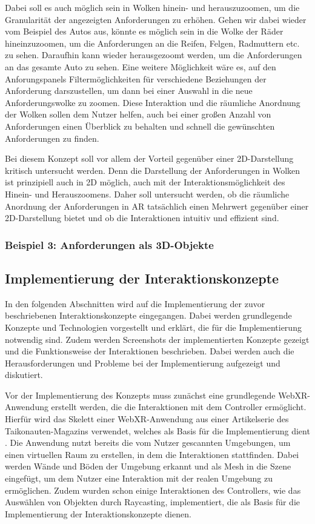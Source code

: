 Dabei soll es auch möglich sein in Wolken hinein- und herauszuzoomen, um die Granularität der angezeigten Anforderungen zu erhöhen.
Gehen wir dabei wieder vom Beispiel des Autos aus, könnte es möglich sein in die Wolke der Räder hineinzuzoomen, um die Anforderungen an die Reifen, Felgen, Radmuttern etc. zu sehen.
Daraufhin kann wieder herausgezoomt werden, um die Anforderungen an das gesamte Auto zu sehen.
Eine weitere Möglichkeit wäre es, auf den Anforungspanels Filtermöglichkeiten für verschiedene Beziehungen der Anforderung darszustellen, um dann bei einer Auswahl in die neue Anforderungswolke zu zoomen.
Diese Interaktion und die räumliche Anordnung der Wolken sollen dem Nutzer helfen, auch bei einer großen Anzahl von Anforderungen einen Überblick zu behalten und schnell die gewünschten Anforderungen zu finden.

Bei diesem Konzept soll vor allem der Vorteil gegenüber einer 2D-Darstellung kritisch untersucht werden.
Denn die Darstellung der Anforderungen in Wolken ist prinzipiell auch in 2D möglich, auch mit der Interaktionsmöglichkeit des Hinein- und Herauszoomens.
Daher soll untersucht werden, ob die räumliche Anordnung der Anforderungen in AR tatsächlich einen Mehrwert gegenüber einer 2D-Darstellung bietet und ob die Interaktionen intuitiv und effizient sind.


\subsubsection{Beispiel 3: Anforderungen als 3D-Objekte}

\subsection{Implementierung der Interaktionskonzepte}

In den folgenden Abschnitten wird auf die Implementierung der zuvor beschriebenen Interaktionskonzepte eingegangen.
Dabei werden grundlegende Konzepte und Technologien vorgestellt und erklärt, die für die Implementierung notwendig sind.
Zudem werden Screenshots der implementierten Konzepte gezeigt und die Funktionsweise der Interaktionen beschrieben.
Dabei werden auch die Herausforderungen und Probleme bei der Implementierung aufgezeigt und diskutiert.

Vor der Implementierung des Konzepts muss zunächst eine grundlegende WebXR-Anwendung erstellt werden, die die Interaktionen mit dem Controller ermöglicht.
Hierfür wird das Skelett einer WebXR-Anwendung aus einer Artikelserie des Taikonauten-Magazins verwendet, welches als Basis für die Implementierung dient \autocite[][]{taikonauten-magazine}.
Die Anwendung nutzt bereits die vom Nutzer gescannten Umgebungen, um einen virtuellen Raum zu erstellen, in dem die Interaktionen stattfinden.
Dabei werden Wände und Böden der Umgebung erkannt und als Mesh in die Szene eingefügt, um dem Nutzer eine Interaktion mit der realen Umgebung zu ermöglichen.
Zudem wurden schon einige Interaktionen des Controllers, wie das Auswählen von Objekten durch Raycasting, implementiert, die als Basis für die Implementierung der Interaktionskonzepte dienen.




